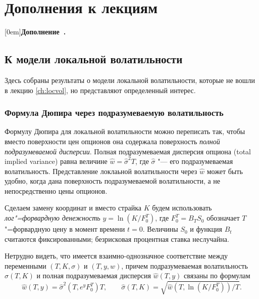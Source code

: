 \stopchaptertoc

\part{Дополнения к лекциям}
[0em]{}{\textbf{Дополнение\ \thecontentslabel.}\hspace{2mm}}{}{\dotfill\contentspage}
\setcounter{chapter}{0}
\renewcommand{\theHchapter}{A\arabic{chapter}}%


\chapter{К модели локальной волатильности}
\label{ch:lv-s}

Здесь собраны результаты о модели локальной волатильности, которые не вошли в лекцию \ref{ch:locvol}, но представляют определенный интерес. 

\section{Формула Дюпира через подразумеваемую волатильность}

Формулу Дюпира для локальной волатильности можно переписать так, чтобы вместо поверхности цен опционов она содержала поверхность \emph{полной подразумеваемой дисперсии}.
Полная подразумеваемая дисперсия опциона (total implied variance) равна величине $\hat w = \hat\sigma^2 T$, где $\hat\sigma$ "--- его подразумеваемая волатильность.
Представление локлаьной волатильности через $\hat w$ может быть удобно, когда дана поверхность подразумеваемой волатильности, а не непосредственно цены опционов.

Сделаем замену координат и вместо страйка $K$ будем использовать \emph{лог"=форвардную денежность} $y=\ln (K/F_0^T)$, где $F_0^T = B_T S_0$ обозначает $T$"=форвардную цену в момент времени $t=0$.
Величины $S_0$ и функция $B_t$ считаются фиксированными; безрисковая процентная ставка неслучайна.

Нетрудно видеть, что имеется взаимно-однозначное соответствие между переменными $(T,K,\sigma)$ и $(T,y,w)$, причем подразумеваемая волатильность $\hat \sigma(T,K)$ и полная подразумеваемая дисперсия $\hat w(T,y)$ связаны по формулам 
\[
\hat w(T,y) = \hat\sigma^2(T, e^yF_0^T)T, \qquad \hat\sigma(T,K) = \sqrt{\hat w(T,\ln(K/F_0^T))/T}.
\]


